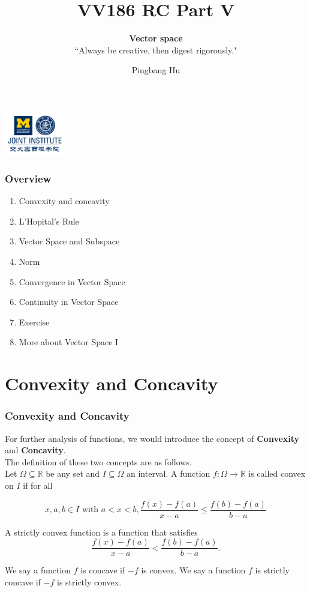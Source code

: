 \documentclass[12pt, t]{beamer}
\title{VV186 RC Part V}
\subtitle{\textbf{Vector space}\\``Always be creative, then digest rigorously."}
\institute[UM-SJTU JI]{University of Michigan-Shanghai Jiao Tong University Joint Institute}
\author{Pingbang Hu}
\begin{document}
\begin{frame}
    \titlepage
    \begin{center}
        \includegraphics[height=2cm]{Figures/logo/logo2.png}
    \end{center}
\end{frame}

\begin{frame}
    \frametitle{Overview}
    \begin{enumerate}
        \item Convexity and concavity
        \item L'Hopital's Rule
        \item Vector Space and Subspace
        \item Norm
        \item Convergence in Vector Space
        \item Continuity in Vector Space
        \item Exercise
        \item More about Vector Space I
    \end{enumerate}
\end{frame}

\section{Convexity and Concavity}
\begin{frame}
    \frametitle{Convexity and Concavity}

For further analysis of functions, we would introduce the concept of \textbf{Convexity} and \textbf{Concavity}. \\
The definition of these two concepts are as follows.\\

\hspace{1em}
Let $\Omega\subseteq\mathbb{R}$ be any set and $I\subseteq\Omega$ an interval. A function $f:\Omega\rightarrow\mathbb{R}$ 
is called convex on $I$ if for all 

\begin{equation*}
    x, a, b\in I \text{ with } a<x<b, \frac{f(x)-f(a)}{x-a}\leq\frac{f(b)-f(a)}{b-a}
\end{equation*}

\vspace{0.5em}
\hspace{1em}
A strictly convex function is a function that satisfies 
\begin{equation}
    \frac{f(x)-f(a)}{x-a}<\frac{f(b)-f(a)}{b-a}.
\end{equation}

\hspace{1em}
We say a function $f$ is concave if $-f$ is convex. We say a function $f$ is strictly concave if $-f$ is strictly convex.





\end{frame}
\end{document}
